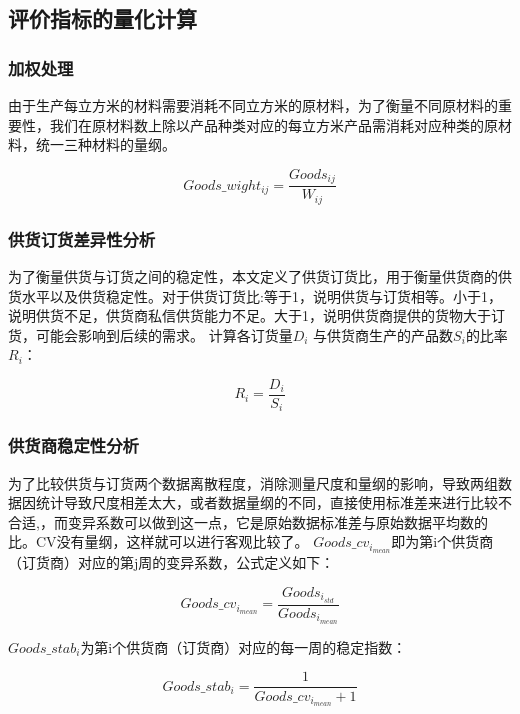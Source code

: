\documentclass[UTF8]{ctexart}
\begin{document}
\subsection{评价指标的量化计算}

\subsubsection{加权处理}
由于生产每立方米的材料需要消耗不同立方米的原材料，为了衡量不同原材料的重要性，我们在原材料数上除以产品种类对应的每立方米产品需消耗对应种类的原材料，统一三种材料的量纲。

\begin{equation}
	Goods\_wight_{ij} = \frac{Goods_{ij}}{W_{ij}}
\end{equation}

\subsubsection{供货订货差异性分析}
为了衡量供货与订货之间的稳定性，本文定义了供货订货比，用于衡量供货商的供货水平以及供货稳定性。对于供货订货比:等于1，说明供货与订货相等。小于1，说明供货不足，供货商私信供货能力不足。大于1，说明供货商提供的货物大于订货，可能会影响到后续的需求。
计算各订货量$D_{i}$ 与供货商生产的产品数$S_i$的比率$R_{i}$：

\begin{equation}
	R_{i} = \frac{D_{i}}{S_{i}}
\end{equation}

\subsubsection{供货商稳定性分析}
为了比较供货与订货两个数据离散程度，消除测量尺度和量纲的影响，导致两组数据因统计导致尺度相差太大，或者数据量纲的不同，直接使用标准差来进行比较不合适,，而变异系数可以做到这一点，它是原始数据标准差与原始数据平均数的比。CV没有量纲，这样就可以进行客观比较了。
$Goods\_{cv}_{i_{mean}}$即为第i个供货商（订货商）对应的第j周的变异系数，公式定义如下：

\begin{equation}
	Goods\_{cv}_{i_{mean}} =\frac{Goods_{i_{std}}}{Goods_{i_{mean}}}
\end{equation}

$Goods\_stab_{i}$为第i个供货商（订货商）对应的每一周的稳定指数：

\begin{equation}
	Goods\_stab_{i} = \frac{1}{Goods\_{cv}_{i_{mean}}+1}
\end{equation}
\end{document}
